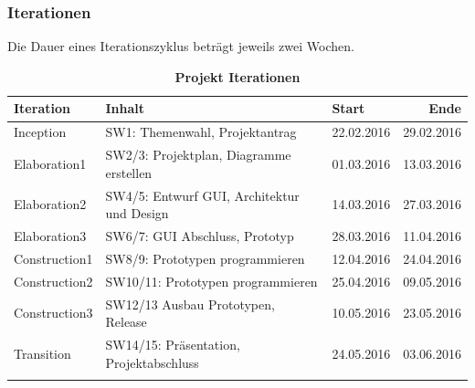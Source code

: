 \documentclass[a4,12pt]{scrartcl}
\begin{document}
\subsubsection{Iterationen}
Die Dauer eines Iterationszyklus beträgt jeweils zwei Wochen. 
\begin{table}[htb]
\centering
    \begin{tabular}{@{} p{3cm} l l r@{}}\toprule    
    {Iteration} & {Inhalt} & {Start} & {Ende}\\ \midrule
    Inception& SW1: Themenwahl, Projektantrag & 22.02.2016  & 29.02.2016\\ \addlinespace
    Elaboration1&SW2/3: Projektplan, Diagramme erstellen  & 01.03.2016 & 13.03.2016\\ \addlinespace
    Elaboration2 &SW4/5: Entwurf GUI, Architektur und Design & 14.03.2016 & 27.03.2016\\ \addlinespace
    Elaboration3 &SW6/7:  GUI Abschluss, Prototyp & 28.03.2016  & 11.04.2016\\ \addlinespace
    Construction1 &SW8/9: Prototypen programmieren & 12.04.2016  & 24.04.2016\\ \addlinespace
    Construction2 &SW10/11: Prototypen programmieren & 25.04.2016  & 09.05.2016\\ \addlinespace
    Construction3 &SW12/13  Ausbau Prototypen, Release & 10.05.2016  & 23.05.2016\\ \addlinespace
    Transition &SW14/15:  Präsentation, Projektabschluss &  24.05.2016 & 03.06.2016\\ \addlinespace
    \bottomrule
    \end{tabular}
\caption{\textbf{Projekt Iterationen}}
\end{table}
\end{document}
